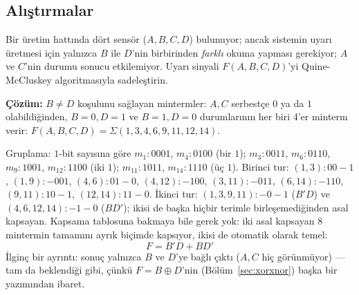 \subsection{Alıştırmalar}\label{sec:qm-alistirmalar}
\begin{alistirma}[\orta]
Bir üretim hattında dört sensör ($A,B,C,D$) bulunuyor; ancak sistemin uyarı üretmesi
için yalnızca $B$ ile $D$'nin birbirinden \emph{farklı} okuma yapması gerekiyor;
$A$ ve $C$'nin durumu sonucu etkilemiyor. Uyarı sinyali $F(A,B,C,D)$'yi Quine-McCluskey
algoritmasıyla sadeleştirin.

\textbf{Çözüm:} $B\neq D$ koşulunu sağlayan mintermler: $A,C$ serbestçe $0$ ya da $1$
olabildiğinden, $B{=}0,D{=}1$ ve $B{=}1,D{=}0$ durumlarının her biri $4$'er minterm
verir: $F(A,B,C,D)=\Sigma(1,3,4,6,9,11,12,14)$.

Gruplama: $1$-bit sayısına göre $m_1{:}0001$, $m_4{:}0100$ (bir $1$); $m_3{:}0011$,
$m_6{:}0110$, $m_9{:}1001$, $m_{12}{:}1100$ (iki $1$); $m_{11}{:}1011$, $m_{14}{:}1110$
(üç $1$). Birinci tur: $(1,3){:}00{-}1$, $(1,9){:}{-}001$, $(4,6){:}01{-}0$,
$(4,12){:}{-}100$, $(3,11){:}{-}011$, $(6,14){:}{-}110$, $(9,11){:}10{-}1$,
$(12,14){:}11{-}0$. İkinci tur: $(1,3,9,11){:}{-}0{-}1$ ($B'D$) ve
$(4,6,12,14){:}{-}1{-}0$ ($BD'$); ikisi de başka hiçbir terimle birleşemediğinden asal
kapsayan. Kapsama tablosuna bakmaya bile gerek yok: iki asal kapsayan $8$ mintermin
tamamını ayrık biçimde kapsıyor, ikisi de otomatik olarak temel:
\[
F = B'D + BD'
\]
İlginç bir ayrıntı: sonuç yalnızca $B$ ve $D$'ye bağlı çıktı ($A,C$ hiç görünmüyor) ---
tam da beklendiği gibi, çünkü $F=B\oplus D$'nin (Bölüm~\ref{sec:xorxnor}) başka bir
yazımından ibaret.
\end{alistirma}
